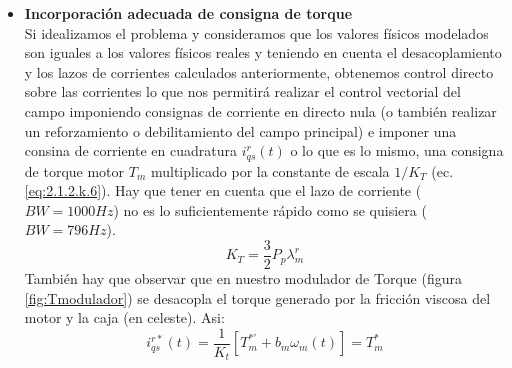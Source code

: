 \documentclass[10pt]{article}
\begin{document}
\begin{itemize}
\item \textbf{Incorporación adecuada de consigna de torque}\\
Si idealizamos el problema y consideramos que los valores físicos modelados son iguales a los valores físicos reales y teniendo en cuenta el desacoplamiento y los lazos de corrientes calculados anteriormente, obtenemos control directo sobre las corrientes lo que nos permitirá realizar el control vectorial del campo imponiendo consignas de corriente en directo nula (o también realizar un reforzamiento o debilitamiento del campo principal) e imponer una consina de corriente en cuadratura $i^{r}_{qs}(t)$ o  lo que es lo mismo, una consigna de torque motor $T_{m}$ multiplicado por la constante de escala $1/K_{T}$ (ec.\ref{eq:2.1.2.k.6}). Hay que tener en cuenta que el lazo de corriente ($BW=1000Hz$) no es lo suficientemente rápido como se quisiera ($BW=796Hz$).
		\begin{equation}
	K_{T}=\frac{3}{2}P_{p}\lambda^{r}_{m}
	\label{eq:2.1.2.k.6}
	\end{equation}
	También hay que observar que en nuestro modulador de Torque (figura \ref{fig:Tmodulador}) se desacopla el torque generado por la fricción viscosa del motor y la caja (en celeste). Asi:
			\begin{equation}
	i^{r*}_{qs}(t)=\frac{1}{K_{t}}[T^{*'}_{m}+b_{m}\omega_{m}(t)]=T^{*}_{m}
	\label{eq:2.1.2.k.7}
	\end{equation}
	

\end{itemize}
\end{document}
